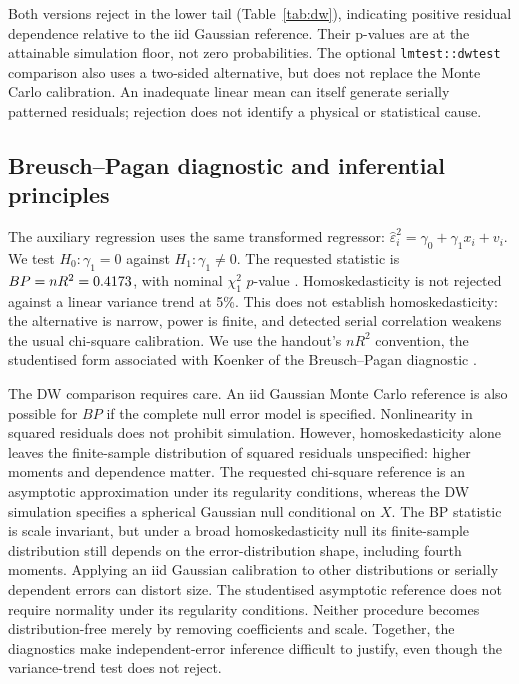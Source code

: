 \documentclass[11pt,a4paper]{article}
\begin{document}
Both versions reject in the lower tail (Table~\ref{tab:dw}), indicating positive residual dependence relative to the iid Gaussian reference. Their p-values are at the attainable simulation floor, not zero probabilities. The optional \texttt{lmtest::dwtest} comparison also uses a two-sided alternative, but does not replace the Monte Carlo calibration. An inadequate linear mean can itself generate serially patterned residuals; rejection does not identify a physical or statistical cause.

\subsection{Breusch--Pagan diagnostic and inferential principles}
The auxiliary regression uses the same transformed regressor: $\widehat\varepsilon_i^2=\gamma_0+\gamma_1x_i+v_i$. We test $H_0:\gamma_1=0$ against $H_1:\gamma_1\neq0$. The requested statistic is $BP=nR^2=0.4173$, with nominal $\chi^2_1$ $p$-value \BPp. Homoskedasticity is not rejected against a linear variance trend at 5\%. This does not establish homoskedasticity: the alternative is narrow, power is finite, and detected serial correlation weakens the usual chi-square calibration. We use the handout's $nR^2$ convention, the studentised form associated with Koenker \cite{koenker} of the Breusch--Pagan diagnostic \cite{bp}.

The DW comparison requires care. An iid Gaussian Monte Carlo reference is also possible for $BP$ if the complete null error model is specified. Nonlinearity in squared residuals does not prohibit simulation. However, homoskedasticity alone leaves the finite-sample distribution of squared residuals unspecified: higher moments and dependence matter. The requested chi-square reference is an asymptotic approximation under its regularity conditions, whereas the DW simulation specifies a spherical Gaussian null conditional on $X$. The BP statistic is scale invariant, but under a broad homoskedasticity null its finite-sample distribution still depends on the error-distribution shape, including fourth moments. Applying an iid Gaussian calibration to other distributions or serially dependent errors can distort size. The studentised asymptotic reference does not require normality under its regularity conditions. Neither procedure becomes distribution-free merely by removing coefficients and scale. Together, the diagnostics make independent-error inference difficult to justify, even though the variance-trend test does not reject.
\end{document}
